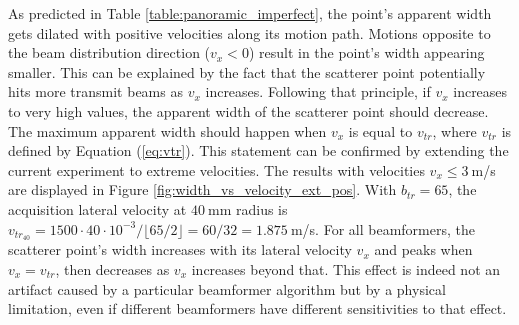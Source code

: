 As predicted in Table \ref{table:panoramic_imperfect}, the point's apparent width gets dilated with positive velocities along its motion path. Motions opposite to the beam distribution direction ($v_x < 0$) result in the point's width appearing smaller. This can be explained by the fact that the scatterer point potentially hits more transmit beams as $v_x$ increases. Following that principle, if $v_x$ increases to very high values, the apparent width of the scatterer point should decrease. The maximum apparent width should happen when $v_x$ is equal to $v_{tr}$, where $v_{tr}$ is defined by Equation (\ref{eq:vtr}). This statement can be confirmed by extending the current experiment to extreme velocities. The results with velocities $v_x \leq 3~$m/s are displayed in Figure \ref{fig:width_vs_velocity_ext_pos}. With $b_{tr} = 65$, the acquisition lateral velocity at $40~$mm radius is $v_{tr_{40}} = 1500 \cdot 40 \cdot 10^{-3} / \lfloor 65 / 2 \rfloor = 60 / 32 = 1.875~$m/s. For all beamformers, the scatterer point's width increases with its lateral velocity $v_x$ and peaks when $v_x = v_{tr}$, then decreases as $v_x$ increases beyond that. This effect is indeed not an artifact caused by a particular beamformer algorithm but by a physical limitation, even if different beamformers have different sensitivities to that effect.

